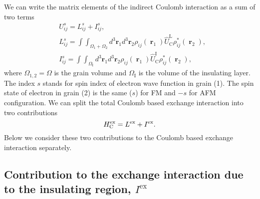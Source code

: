 \documentclass[aps,prb,amsmath,amssymb,twocolumn,superscriptaddress,showpacs,floatfix]{revtex4-1}
\DeclareMathOperator{\rv}{\mathbf r}
\begin{document}
We can write the matrix elements of the indirect Coulomb interaction as a sum of two terms
\begin{equation}\label{Eq:ExMatEl2}
\begin{split}
&U^{s}_{ij}=L^s_{ij}+I^s_{ij},\\
&L^s_{ij}=\!\int\!\!\int_{\Omega_1+\Omega_2} \!\!d^3\mathbf r_1 d^3 \mathbf r_2 \rho_{ij}(\rv_1)\hat U^\mathrm L_\mathrm C \rho_{ij}^*(\rv_2),\\
&I^s_{ij}=\!\int\!\!\int_{\Omega_\mathrm I} d^3\mathbf r_1 d^3 \mathbf r_2 \rho_{ij}(\rv_1)\hat U^\mathrm{I}_\mathrm C \rho_{ij}^*(\rv_2),
\end{split}
\end{equation}
where $\Omega_{1,2}=\Omega$ is the grain volume
and $\Omega_\mathrm I$ is the volume of the insulating layer.
The index $s$ stands for spin index of electron wave function
in grain (1). The spin state of electron in grain (2) is the same ($s$)
for FM and $-s$ for AFM configuration.
We can split the total Coulomb based exchange interaction into two contributions
\begin{equation}\label{Eq:Ex2}
H^\mathrm{ex}_{\mathrm C}=L^\mathrm{ex}+I^\mathrm{ex}.\\
\end{equation}
Below we consider these two contributions to the Coulomb based exchange interaction separately.



\subsection{Contribution to the exchange interaction due to the insulating region, $I^\mathrm{ex}$}
\end{document}
